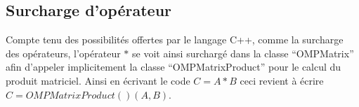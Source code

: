 \subsection{Surcharge d'opérateur}

Compte tenu des possibilités offertes par le langage C++, comme la surcharge des opérateurs, l'opérateur $*$ se voit ainsi surchargé dans la classe ``OMPMatrix'' afin d'appeler implicitement la classe ``OMPMatrixProduct'' pour le calcul du produit matriciel. Ainsi en écrivant le code $C = A * B$ ceci revient à écrire $C = OMPMatrixProduct()(A, B)$.
